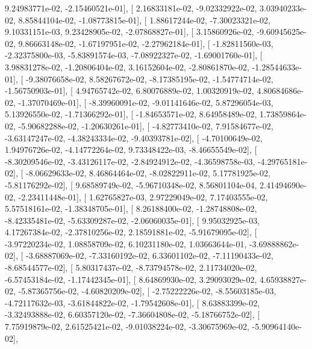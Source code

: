 \documentclass{article}
\begin{document}
          9.24983771e-02,  -2.15460521e-01],
       [  2.16833181e-02,  -9.02332922e-02,   3.03940233e-02,
          8.85844104e-02,  -1.08773815e-01],
       [  1.88617244e-02,  -7.30023321e-02,   9.10331151e-03,
          9.23428905e-02,  -2.07868827e-01],
       [  3.15860926e-02,  -9.60945625e-02,   9.86663148e-02,
         -1.67197951e-02,  -2.27962184e-01],
       [ -1.82811560e-03,  -2.32375800e-03,  -5.83891574e-03,
         -7.08922327e-02,  -1.69001760e-01],
       [  3.98831278e-02,  -1.20806404e-02,   3.16152604e-02,
         -2.80861870e-02,  -1.28544633e-01],
       [ -9.38076658e-02,   8.58267672e-02,  -8.17385195e-02,
         -1.54774714e-02,  -1.56750903e-01],
       [  4.94765742e-02,   6.80076889e-02,   1.00320919e-02,
          4.80684686e-02,  -1.37070469e-01],
       [ -8.39960091e-02,  -9.01141646e-02,   5.87296054e-03,
          5.13926550e-02,  -1.71366292e-01],
       [ -1.84653571e-02,   8.64958489e-02,   1.73859864e-02,
         -5.90682288e-02,  -1.20630261e-01],
       [ -4.82773410e-02,   7.91584677e-02,  -3.63147247e-02,
         -4.38243334e-02,  -9.40393781e-02],
       [ -4.70100649e-02,   1.94976726e-02,  -4.14772264e-02,
          9.73348422e-03,  -8.46655549e-02],
       [ -8.30209546e-02,  -3.43126117e-02,  -2.84924912e-02,
         -4.36598758e-03,  -4.29765181e-02],
       [ -8.06629633e-02,   8.46864464e-02,  -8.02822911e-02,
          5.17781925e-02,  -5.81176292e-02],
       [  9.68589749e-02,  -5.96710348e-02,   8.56801104e-04,
          2.41494690e-02,  -2.23411448e-01],
       [  1.62765827e-03,   2.97229049e-02,   7.17403555e-02,
          5.57518161e-02,  -1.38348705e-01],
       [  8.26188400e-02,  -1.28748808e-02,  -8.42335481e-02,
         -5.63309287e-02,  -2.06060035e-01],
       [  9.95032925e-03,   4.17267384e-02,  -2.37810256e-02,
          2.18591881e-02,  -5.91679095e-02],
       [ -3.97220234e-02,   1.08858709e-02,   6.10231180e-02,
          1.03663644e-01,  -3.69888862e-02],
       [ -3.68887069e-02,  -7.33160192e-02,   6.33601102e-02,
         -7.11190433e-02,  -8.68544577e-02],
       [  5.80317437e-02,  -8.73794578e-02,   2.11734020e-02,
         -6.57453184e-02,  -1.17442345e-01],
       [  8.64869930e-02,   3.29093029e-02,   4.65938827e-02,
         -5.87365756e-02,  -4.60820209e-02],
       [ -2.75222226e-02,  -8.55603185e-03,  -4.72117632e-03,
         -3.61844822e-02,  -1.79542608e-01],
       [  8.63883399e-02,  -3.32493888e-02,   6.60357120e-02,
         -7.36604808e-02,  -5.18766752e-02],
       [  7.75919879e-02,   2.61525421e-02,  -9.01038224e-02,
         -3.30675969e-02,  -5.90964140e-02],
\end{document}

